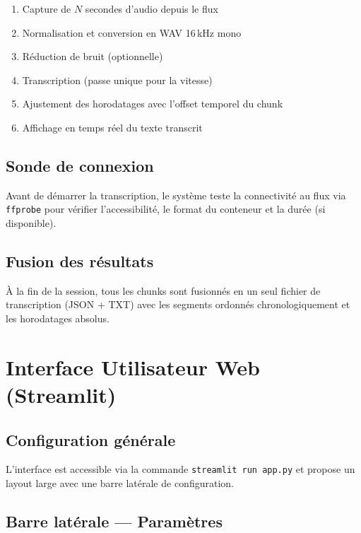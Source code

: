 \documentclass[12pt,a4paper]{report}
\begin{document}
\begin{enumerate}
    \item Capture de $N$ secondes d'audio depuis le flux
    \item Normalisation et conversion en WAV 16\,kHz mono
    \item Réduction de bruit (optionnelle)
    \item Transcription (passe unique pour la vitesse)
    \item Ajustement des horodatages avec l'offset temporel du chunk
    \item Affichage en temps réel du texte transcrit
\end{enumerate}

\section{Sonde de connexion}

Avant de démarrer la transcription, le système teste la connectivité au flux via \texttt{ffprobe} pour vérifier l'accessibilité, le format du conteneur et la durée (si disponible).

\section{Fusion des résultats}

À la fin de la session, tous les chunks sont fusionnés en un seul fichier de transcription (JSON + TXT) avec les segments ordonnés chronologiquement et les horodatages absolus.

\chapter{Interface Utilisateur Web (Streamlit)}

\section{Configuration générale}

L'interface est accessible via la commande \texttt{streamlit run app.py} et propose un layout large avec une barre latérale de configuration.

\section{Barre latérale — Paramètres}
\end{document}
